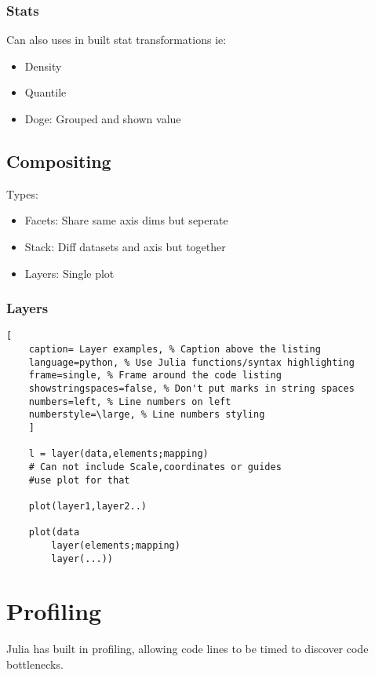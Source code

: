 \documentclass[11pt]{scrartcl} %
\begin{document}
\subsubsection{Stats}

Can also uses in built stat transformations ie:

\begin{itemize}
	\item Density
	\item Quantile
	\item Doge: Grouped and shown value
\end{itemize}

\subsection{Compositing}

Types:
\begin{itemize}
	\item Facets: Share same axis dims but seperate
	\item Stack: Diff datasets and axis but together
	\item Layers: Single plot
\end{itemize}

\subsubsection{Layers}

\begin{lstlisting}[
	caption= Layer examples, % Caption above the listing
	language=python, % Use Julia functions/syntax highlighting
	frame=single, % Frame around the code listing
	showstringspaces=false, % Don't put marks in string spaces
	numbers=left, % Line numbers on left
	numberstyle=\large, % Line numbers styling
	]

	l = layer(data,elements;mapping) 
	# Can not include Scale,coordinates or guides
	#use plot for that

	plot(layer1,layer2..)

	plot(data
		layer(elements;mapping)
		layer(...))

\end{lstlisting}

\newpage
\section{Profiling}

Julia has built in profiling, allowing code lines to be timed to discover code bottlenecks.\\
\end{document}
